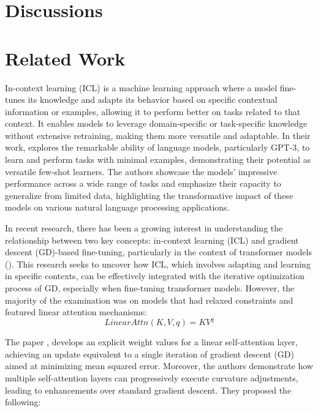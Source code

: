 \documentclass[11pt]{article}
\begin{document}
\section{Discussions}

\section{Related Work}
In-context learning (ICL) is a machine learning approach where a model fine-tunes its knowledge and adapts its behavior based on specific contextual information or examples, allowing it to perform better on tasks related to that context.
It enables models to leverage domain-specific or task-specific knowledge without extensive retraining, making them more versatile and adaptable.
In their work, \cite{NEURIPS2020_1457c0d6} explores the remarkable ability of language models, particularly GPT-3, to learn and perform tasks with minimal examples, demonstrating their potential as versatile few-shot learners.
The authors showcase the models' impressive performance across a wide range of tasks and emphasize their capacity to generalize from limited data, highlighting the transformative impact of these models on various natural language processing applications.

In recent research, there has been a growing interest in understanding the relationship between two key concepts: in-context learning (ICL) and gradient descent (GD)-based fine-tuning, particularly in the context of transformer models (\cite{pmlr-v202-von-oswald23a,2022arXiv221210559D}).
This research seeks to uncover how ICL, which involves adapting and learning in specific contexts, can be effectively integrated with the iterative optimization process of GD, especially when fine-tuning transformer models.
However, the majority of the examination was on models that had relaxed constraints and featured linear attention mechanisms:
\begin{equation}
	LinearAttn(K,V,q)=KV^q
\end{equation}

The paper \cite{pmlr-v202-von-oswald23a}, develops an explicit weight values for a linear self-attention layer, achieving an update equivalent to a single iteration of gradient descent (GD) aimed at minimizing mean squared error. Moreover, the authors demonstrate how multiple self-attention layers can progressively execute curvature adjustments, leading to enhancements over standard gradient descent.
They proposed the following:
\end{document}
